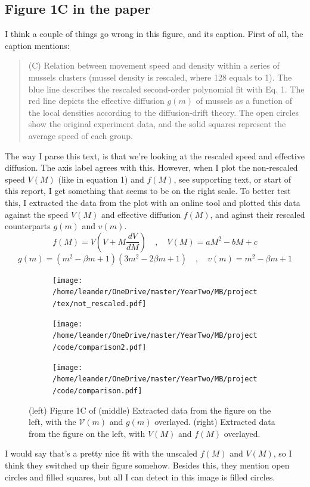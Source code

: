 \documentclass[a4paper]{jpconf}
\begin{document}
\subsection*{Figure 1C in the paper}
I think a couple of things go wrong in this figure, and its caption. First of all, the caption mentions:
\begin{quotation}
    (C) Relation between movement speed and density within a series of mussels clusters (mussel density is rescaled, where 128 equals to 1). The blue line describes the rescaled second-order polynomial ﬁt with Eq. 1. The red line depicts the effective diffusion $g(m)$ of mussels as a function of the local densities according to the diffusion-drift theory. The open circles show the original experiment data, and the solid squares
represent the average speed of each group.
\end{quotation}
The way I parse this text, is that we're looking at the rescaled speed and effective diffusion. The axis label agrees with this. However, when I plot the non-rescaled speed $V(M)$ (like in equation 1) and $f(M)$, see supporting text, or start of this report, I get something that seems to be on the right scale. To better test this, I extracted the data from the plot with an online tool \cite{Rohatgi2022} and plotted this data against the speed $V(M)$ and effective diffusion $f(M)$, and aginst their rescaled counterparts $g(m)$ and $v(m)$.
\[f(M) = V\left(V+M\frac{dV}{dM}\right)\quad,\quad V(M)=aM^2-bM+c\]
\[g(m)=(m^2-\beta m+1)(3m^2-2\beta m+1)\quad ,\quad v(m)=m^2-\beta m+1\]

\begin{figure}[h!]
    \centering
    \begin{subfigure}[t]{0.3\textwidth}\centering
        \texttt{[image: /home/leander/OneDrive/master/YearTwo/MB/project/tex/not\_rescaled.pdf]}

    \end{subfigure}\hfill
    \begin{subfigure}[t]{0.3\textwidth}\centering
        \texttt{[image: /home/leander/OneDrive/master/YearTwo/MB/project/code/comparison2.pdf]}

    \end{subfigure}\hfill
    \begin{subfigure}[t]{0.3\textwidth}\centering
        \texttt{[image: /home/leander/OneDrive/master/YearTwo/MB/project/code/comparison.pdf]}
        
    \end{subfigure}
    \caption{(left) Figure 1C of \cite{doi:10.1073/pnas.1222339110} (middle) Extracted data from the figure on the left, with the $\mathcal V(m)$ and $g(m)$ overlayed. (right) Extracted data from the figure on the left, with $V(M)$ and $f(M)$ overlayed.}\label{comparison}
\end{figure}
I would say that's a pretty nice fit with the unscaled $f(M)$ and $V(M)$, so I think they switched up their figure somehow. Besides this, they mention open circles and filled squares, but all I can detect in this image is filled circles. 
\end{document}
